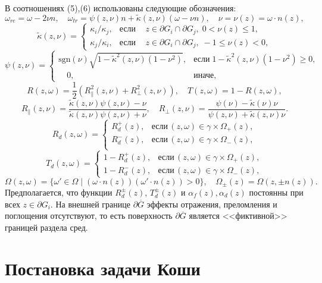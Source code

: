 \documentclass[12pt,reqno]{report}
\def\sgn{\mathrm{sgn}}
\begin{document}
В соотношениях (5),(6) использованы следующие обозначения:   
$$
\omega_{re} =\omega -2 \nu n, \quad \omega_{tr} =\psi (z,\nu) n +
\widetilde{\kappa}(z,\nu)( \omega - \nu n),   \quad
\nu=\nu(z)=\omega \cdot n(z),
$$
$$
 \widetilde{\kappa}(z,\nu) =
  \begin{cases}
 {\kappa_i}/{\kappa_j}, & \text{если} \,    \quad z \in \partial G_i \cap \partial G_j, \;   0<     \nu(z) \leq 1, \\
 {\kappa_j}/{\kappa_i}, & \text{если} \,    \quad z \in \partial G_i \cap \partial G_j, \;   -1 \leq \nu(z)  <
 0,
  \end{cases}
$$
$$
\psi(z,\nu)=
 \begin{cases}
 {\sgn}(\nu) \sqrt{1- \widetilde{\kappa}^2(z,\nu) (1-\nu^2)}, & \text{если}
\;      1- \widetilde{\kappa}^2(z,\nu) (1-\nu^2) \geq 0, \\
\quad  0,     &  \text{иначе},
  \end{cases}
$$
$$
R (z,\omega)=\frac{1}{2} (R^2_{\|}(z,\nu)+R^2_{\bot}(z,\nu)),
\quad
T(z,\omega)= 
    1-R(z,\omega),
$$
$$
R_{\|}(z,\nu)=\frac{\widetilde{\kappa}(z,\nu)
\psi(z,\nu)-\nu}{\widetilde{\kappa}(z,\nu) \psi(z,\nu)+\nu},\quad
R_{\bot}(z,\nu)=\frac{\psi(\nu)-\widetilde{\kappa}(\nu)\nu}
{\psi(z,\nu)+\widetilde{\kappa}(z,\nu)\nu}.
$$
$$
 R_d(z,\omega) =
  \begin{cases}
 R^+_d(z), & \text{если} \,     (z,\omega) \in \gamma \times \Omega_+(z), \\
 R^-_d(z), & \text{если} \,     (z,\omega) \in \gamma \times  \Omega_-(z), \\
  \end{cases}
$$
$$
 T_d(z,\omega) =
  \begin{cases}
 1-R^+_d(z), & \text{если} \,     (z,\omega) \in \gamma \times \Omega_+(z), \\
 1-R^-_d(z), & \text{если} \,      (z,\omega) \in \gamma \times \Omega_-(z),
  \end{cases}
$$
$$
\Omega(z,\omega) =\{\omega' \in \Omega \; |\;  ( \omega
\cdot n(z))(\omega' \cdot n(z))>0 \}, \quad
\Omega_{\pm}(z)=\Omega(z,\pm n(z)).
$$
Предполагается, что  функции $R_{d}^{\pm}(z)$, $T_{d}^{\pm}(z)$ и  $ \alpha_f(z),\alpha_d(z) $ постоянны  при всех $z \in \partial G_i$.
На внешней границе  $\partial \overline{G}$ эффекты отражения,  преломления и поглощения отсутствуют, то есть поверхность  $\partial \overline{G}$ является <<фиктивной>>  границей раздела сред.

\section{Постановка задачи Коши}
\end{document}
